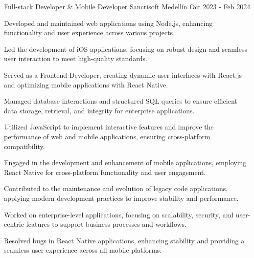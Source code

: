 \newcommand{\quotes}[1]{``#1''}

\begin{cventries}

\cventry
{Full-stack Developer & Mobile Developer} %
{Sancrisoft} %
{Medellín} %
{Oct 2023 - Feb 2024} %
{
  \begin{cvitems} %
    \item {Developed and maintained web applications using Node.js, enhancing functionality and user experience across various projects.}
    \item {Led the development of iOS applications, focusing on robust design and seamless user interaction to meet high-quality standards.}
    \item {Served as a Frontend Developer, creating dynamic user interfaces with React.js and optimizing mobile applications with React Native.}
    \item {Managed database interactions and structured SQL queries to ensure efficient data storage, retrieval, and integrity for enterprise applications.}
    \item {Utilized JavaScript to implement interactive features and improve the performance of web and mobile applications, ensuring cross-platform compatibility.}
    \item {Engaged in the development and enhancement of mobile applications, employing React Native for cross-platform functionality and user engagement.}
    \item {Contributed to the maintenance and evolution of legacy code applications, applying modern development practices to improve stability and performance.}
    \item {Worked on enterprise-level applications, focusing on scalability, security, and user-centric features to support business processes and workflows.}
    \item {Resolved bugs in React Native applications, enhancing stability and providing a seamless user experience across all mobile platforms.}
  \end{cvitems}
}
\end{cventries}
